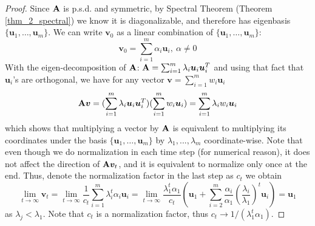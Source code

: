 \documentclass[../book-template.tex]{subfiles}
\begin{document}
\begin{proof}
Since ${\bf A}$ is p.s.d. and symmetric, by Spectral Theorem (Theorem \ref{thm_2_spectral}) we know it is diagonalizable, and therefore has eigenbasis $\{\bm{u}_1,\dots,\bm{u}_m\}$. We can write $\bm{v}_0$ as a linear combination of $\{\bm{u}_1,\dots,\bm{u}_m\}$:
\begin{equation*}
    \bm{v}_0 = \sum_{i=1}^{m} \alpha_i \bm{u}_i,\ \alpha\neq0
\end{equation*}
With the eigen-decomposition of ${\bf A}$: ${\bf A}= \sum_{i=1}^m \lambda_i\bm{u}_i\bm{u}_i^T $ and using that fact that $\bm{u}_i$'s are orthogonal, we have for any vector $\bm{v} = \sum_{i=1}^{m} w_i \bm{u}_i$
\begin{equation*}
    {\bf A}\bm{v} = (\sum_{i=1}^m \lambda_i\bm{u}_i\bm{u}_i^T)(\sum_{i=1}^{m} w_i \bm{u}_i) = \sum_{i=1}^{m} \lambda_i w_i \bm{u}_i
\end{equation*}
which shows that multiplying a vector by ${\bf A}$ is equivalent to multiplying its coordinates under the basis $\{\bm{u}_1,\dots,\bm{u}_m\}$ by $\lambda_1, ..., \lambda_m$ coordinate-wise. Note that even though we do normalization in each time step (for numerical reason), it does not affect the direction of ${\bf A}\bm{v}_t$, and it is equivalent to normalize only once at the end. Thus, denote the normalization factor in the last step as $c_t$ we obtain
\begin{equation*}
    \lim_{t\rightarrow \infty}\bm{v}_t = \lim_{t\rightarrow \infty}\frac{1}{c_t}\sum_{i=1}^{m} \lambda_i^t \alpha_i \bm{u}_i = \lim_{t\rightarrow \infty}\frac{\lambda_1^t\alpha_1}{c_t} \left(\bm{u}_1 + \sum_{i=2}^{m} \frac{\alpha_i}{\alpha_1}\left(\frac{\lambda_i}{\lambda_1}\right)^t\bm{u}_i\right) = \bm{u}_1
\end{equation*}
as $\lambda_j<\lambda_1$. Note that $c_t$ is a normalization factor, thus $c_t\rightarrow 1/(\lambda_1^t\alpha_1)$.
\end{proof}
\end{document}
